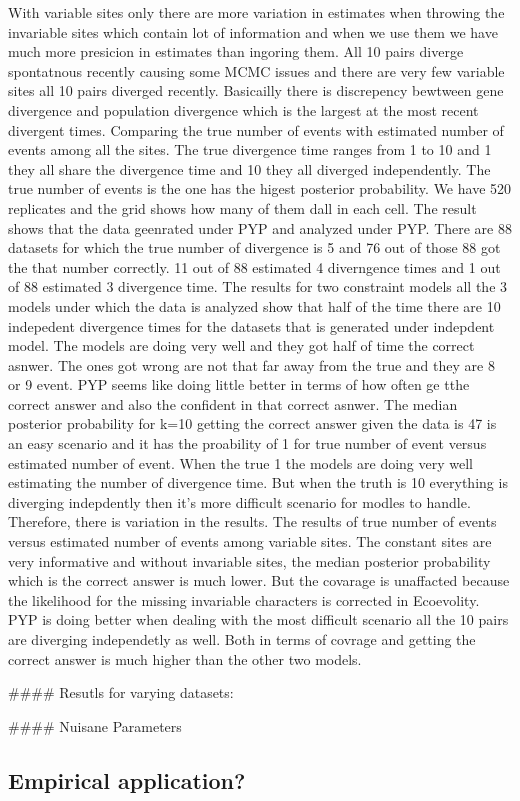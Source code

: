 With variable sites only there are more variation in estimates when throwing the invariable 
sites which contain lot of information and when we use them we have much more presicion in estimates
than ingoring them. All 10 pairs diverge spontatnous recently causing some MCMC issues and there 
are very few variable sites all 10 pairs diverged recently. Basicailly there is discrepency bewtween 
gene divergence and population divergence which is the largest at the most recent divergent times.
Comparing the true number of events with estimated number of events among all the sites. The true 
divergence time ranges from 1 to 10 and 1 they all share the divergence time and 10 they all 
diverged independently. The true number of events is the one has the higest posterior probability.
We have 520 replicates and the grid shows how many of them dall in each cell. The result shows 
that the data geenrated under PYP and analyzed under PYP. There are 88 datasets for which the true 
number of divergence is 5 and 76 out of those 88 got the that number correctly. 11 out of 88 
estimated 4 diverngence times and 1 out of 88 estimated 3 divergence time. 
The results for two constraint models all the 3 models under which the data is analyzed show that 
half of the time there are 10 indepedent divergence times for the datasets that is generated under 
indepdent model. The models are doing very well and they got half of time the correct asnwer. The 
ones got wrong are not that far away from the true and they are 8 or 9 event. PYP seems like 
doing little better in terms of how often ge tthe correct answer and also the confident in that 
correct asnwer. The median posterior probability for k=10 getting the correct answer
given the data is 47%
is an easy scenario and it has the proability of 1 for true number of event versus estimated number of 
event. When the true 1 the models are doing very well estimating the number of divergence time. But 
when the truth is 10 everything is diverging indepdently then it's more difficult scenario for 
modles to handle. Therefore, there is variation in the results. 
The results of true number of events versus estimated number of events among variable sites. The
constant sites are very informative and without invariable sites, the median posterior probability
which is the correct answer is much lower. But the covarage is unaffacted because the 
likelihood for the missing invariable characters is corrected in Ecoevolity. PYP is doing better when 
dealing with the most difficult scenario all the 10 pairs are diverging independetly as well. Both in
terms of covrage and getting the correct answer is much higher than the other two models. 

#### 
Resutls for varying datasets: 

#### 
Nuisane Parameters



\subsection{Empirical application?}
